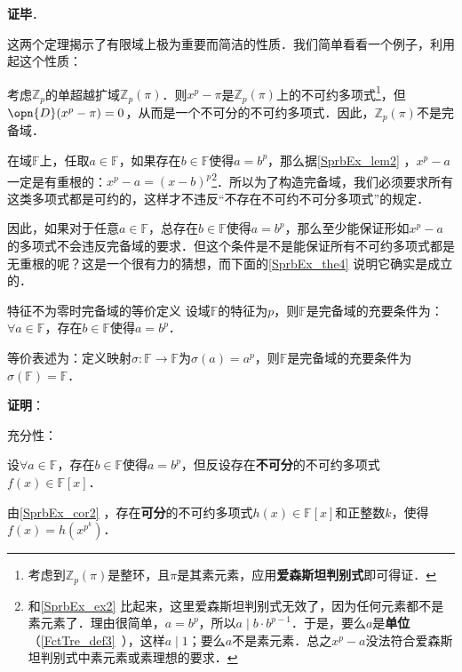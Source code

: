 \textbf{证毕}．


这两个定理揭示了有限域上极为重要而简洁的性质．我们简单看看一个例子，利用起这个性质：




\begin{example}{}\label{SprbEx_ex2}
考虑$\mathbb{Z}_p$的单超越扩域$\mathbb{Z}_p(\pi)$．则$x^p-\pi$是$\mathbb{Z}_p(\pi)$上的不可约多项式\footnote{考虑到$\mathbb{Z}_p(\pi)$是整环，且$\pi$是其素元素，应用\textbf{爱森斯坦判别式}即可得证．}，但$\opn{D}(x^p-\pi)=0$，从而是一个不可分的不可约多项式．因此，$\mathbb{Z}_p(\pi)$不是完备域．

\end{example}



在域$\mathbb{F}$上，任取$a\in\mathbb{F}$，如果存在$b\in\mathbb{F}$使得$a=b^p$，那么据\autoref{SprbEx_lem2} ，$x^p-a$一定是有重根的：$x^p-a=(x-b)^p$\footnote{和\autoref{SprbEx_ex2} 比起来，这里爱森斯坦判别式无效了，因为任何元素都不是素元素了．理由很简单，$a=b^p$，所以$a\mid b\cdot b^{p-1}$．于是，要么$a$是\textbf{单位}（\autoref{FctTre_def3}~），这样$a\mid 1$；要么$a$不是素元素．总之$x^p-a$没法符合爱森斯坦判别式中素元素或素理想的要求．}．所以为了构造完备域，我们必须要求所有这类多项式都是可约的，这样才不违反“不存在不可约不可分多项式”的规定．

因此，如果对于任意$a\in\mathbb{F}$，总存在$b\in\mathbb{F}$使得$a=b^p$，那么至少能保证形如$x^p-a$的多项式不会违反完备域的要求．但这个条件是不是能保证所有不可约多项式都是无重根的呢？这是一个很有力的猜想，而下面的\autoref{SprbEx_the4} 说明它确实是成立的．





\begin{theorem}{特征不为零时完备域的等价定义}\label{SprbEx_the4}
设域$\mathbb{F}$的特征为$p$，则$\mathbb{F}$是完备域的充要条件为：$\forall a\in\mathbb{F}$，存在$b\in\mathbb{F}$使得$a=b^p$．

等价表述为：定义映射$\sigma:\mathbb{F}\to\mathbb{F}$为$\sigma(a)=a^p$，则$\mathbb{F}$是完备域的充要条件为$\sigma(\mathbb{F})=\mathbb{F}$．
\end{theorem}

\textbf{证明}：

充分性：

设$\forall a\in\mathbb{F}$，存在$b\in\mathbb{F}$使得$a=b^p$，但反设存在\textbf{不可分}的不可约多项式$f(x)\in\mathbb{F}[x]$．

由\autoref{SprbEx_cor2} ，存在\textbf{可分}的不可约多项式$h(x)\in\mathbb{F}[x]$和正整数$k$，使得$f(x)=h(x^{p^k})$．

